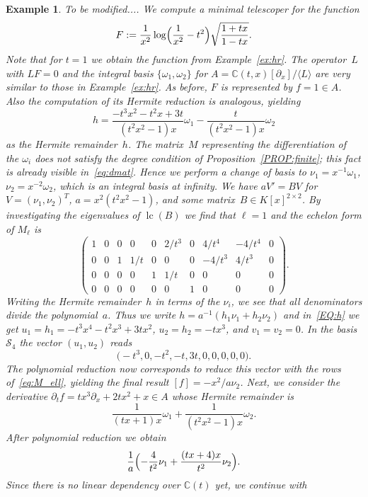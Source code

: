 \documentclass{sig-alternate}
\newtheorem{example}[theorem]{Example}
\def\<#1>{\langle#1\rangle}
\newcommand{\red}{\color{red}}
\newcommand{\bC}{ {\mathbb C}}
\newcommand{\cS}{ {\mathcal S}}
\def\lc{\operatorname{lc}}
\begin{document}
\begin{example} { \red To be modified.... }
We compute a minimal telescoper for the function
\[
  F := \frac{1}{x^2} \log\Bigl(\frac{1}{x^2}-t^2\Bigr)\sqrt{\frac{1+tx}{1-tx}}.
\]
Note that for $t=1$ we
obtain the function from Example~\ref{ex:hr}. The operator~$L$ with $LF=0$
and the integral basis $\{\omega_1,\omega_2\}$ for
$A=\bC(t,x)[\partial_x]/\<L>$ are very similar to those in Example~\ref{ex:hr}.
As before, $F$ is represented by $f=1\in A$.
Also the computation of its Hermite reduction is analogous, yielding
\[
  h = \frac{-t^3x^2-t^2x+3t}{(t^2x^2-1)x} \omega_1 - \frac{t}{(t^2x^2-1)x} \omega_2
\]
as the Hermite remainder~$h$. The matrix~$M$ representing the differentiation
of the $\omega_i$ does not satisfy the degree condition of
Proposition~\ref{PROP:finite}; this fact is already visible
in~\eqref{eq:dmat}. Hence we perform a change of basis to
$\nu_1=x^{-1}\omega_1$, $\nu_2=x^{-2}\omega_2$, which is an integral basis at
infinity. We have $aV'=BV$ for $V=(\nu_1,\nu_2)^T$, $a=x^2(t^2x^2-1)$, and
some matrix~$B\in K[x]^{2\times2}$.  By investigating the eigenvalues of
$\lc(B)$ we find that $\ell=1$ and the echelon form of $M_\ell$ is
\begin{equation}\label{eq:M_ell}
  \begin{pmatrix}
  1 & 0 & 0 & 0 & 0 & 2/t^3 & 0 & 4/t^4 & -4/t^4 & 0 \\
  0 & 0 & 1 & 1/t & 0 & 0 & 0 & -4/t^3 & 4/t^3 & 0 \\
  0 & 0 & 0 & 0 & 1 & 1/t & 0 & 0 & 0 & 0 \\
  0 & 0 & 0 & 0 & 0 & 0 & 1 & 0 & 0 & 0
  \end{pmatrix}.
\end{equation}
Writing the Hermite remainder~$h$ in terms of the $\nu_i$, we see that all
denominators divide the polynomial~$a$. Thus we write
$h=a^{-1}(h_1\nu_1+h_2\nu_2)$ and in~\eqref{EQ:h} we get
$u_1=h_1=-t^3x^4-t^2x^3+3tx^2$, $u_2=h_2=-tx^3$, and $v_1=v_2=0$.
In the basis $\cS_4$ the vector $(u_1,u_2)$ reads
\[
  \bigl(-t^3, 0, -t^2, -t, 3 t, 0, 0, 0, 0, 0\bigr).
\]
The polynomial reduction now corresponds to reduce this vector with the rows
of~\eqref{eq:M_ell}, yielding the final result $[f]=-x^2/a\nu_2$.  Next, we
consider the derivative $\partial_tf=tx^3\partial_x+2tx^2+x\in A$ whose
Hermite remainder is
\[
  \frac{1}{(tx+1)x} \omega_1 + \frac{1}{(t^2x^2-1)x} \omega_2.
\]
After polynomial reduction we obtain
\[
  \frac1a \Bigl( -\frac{4}{t^2} \nu_1 + \frac{(tx+4)x}{t^2} \nu_2 \Bigr).
\]
Since there is no linear dependency over $\bC(t)$ yet, we continue with

\end{example}
\end{document}
